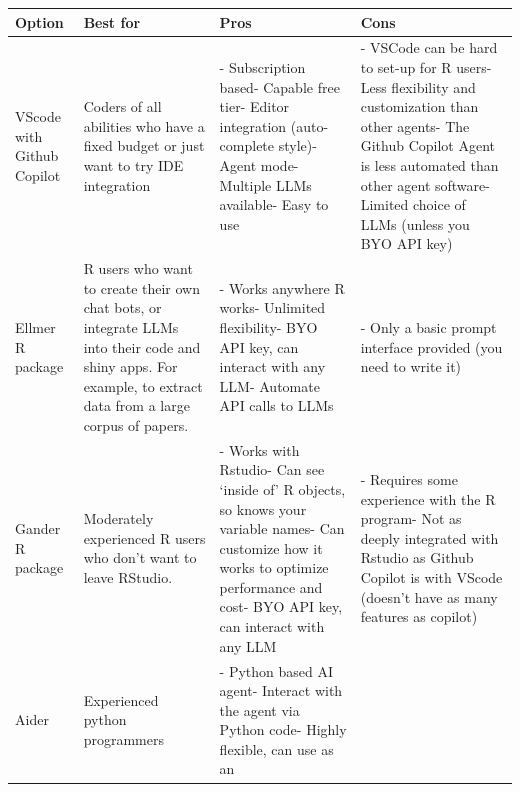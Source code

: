 \documentclass[
  letterpaper,
  DIV=11,
  numbers=noendperiod]{scrreprt}
\begin{document}
\begin{longtable}[]{@{}
  >{\raggedright\arraybackslash}p{}
  >{\raggedright\arraybackslash}p{}
  >{\raggedright\arraybackslash}p{}
  >{\raggedright\arraybackslash}p{}@{}}
\toprule\noalign{}
\begin{minipage}[b]{\linewidth}\raggedright
Option
\end{minipage} & \begin{minipage}[b]{\linewidth}\raggedright
Best for
\end{minipage} & \begin{minipage}[b]{\linewidth}\raggedright
Pros
\end{minipage} & \begin{minipage}[b]{\linewidth}\raggedright
Cons
\end{minipage} \\
\midrule\noalign{}
\endhead
\bottomrule\noalign{}
\endlastfoot
VScode with Github Copilot & Coders of all abilities who have a fixed
budget or just want to try IDE integration & - Subscription based-
Capable free tier- Editor integration (auto-complete style)- Agent mode-
Multiple LLMs available- Easy to use & - VSCode can be hard to set-up
for R users- Less flexibility and customization than other agents- The
Github Copilot Agent is less automated than other agent software-
Limited choice of LLMs (unless you BYO API key) \\
Ellmer R package & R users who want to create their own chat bots, or
integrate LLMs into their code and shiny apps. For example, to extract
data from a large corpus of papers. & - Works anywhere R works-
Unlimited flexibility- BYO API key, can interact with any LLM- Automate
API calls to LLMs & - Only a basic prompt interface provided (you need
to write it) \\
Gander R package & Moderately experienced R users who don't want to
leave RStudio. & - Works with Rstudio- Can see `inside of' R objects, so
knows your variable names- Can customize how it works to optimize
performance and cost- BYO API key, can interact with any LLM & -
Requires some experience with the R program- Not as deeply integrated
with Rstudio as Github Copilot is with VScode (doesn't have as many
features as copilot) \\
Aider & Experienced python programmers & - Python based AI agent-
Interact with the agent via Python code- Highly flexible, can use as an

\end{longtable}
\end{document}
